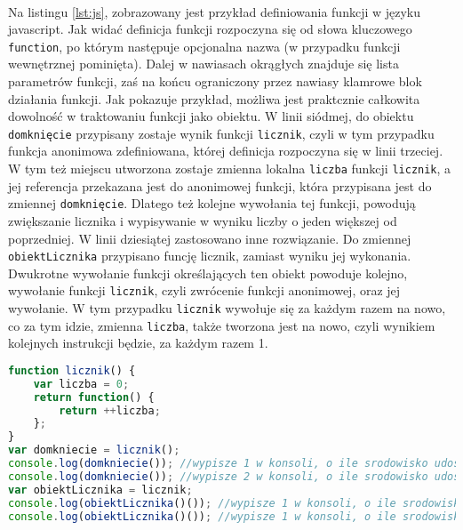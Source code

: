 \documentclass[a4paper,10pt]{report}
\begin{document}
\paragraph{}
Na listingu \ref{lst:js}, zobrazowany jest przykład definiowania funkcji w języku javascript. Jak widać definicja funkcji rozpoczyna się od słowa kluczowego \verb|function|, po którym następuje opcjonalna nazwa (w przypadku funkcji wewnętrznej pominięta). Dalej w nawiasach okrągłych znajduje się lista parametrów funkcji, zaś na końcu ograniczony przez nawiasy klamrowe blok działania funkcji. Jak pokazuje przykład, możliwa jest praktcznie całkowita dowolność w traktowaniu funkcji jako obiektu. W linii siódmej, do obiektu \verb|domknięcie| przypisany zostaje wynik funkcji \verb|licznik|, czyli w tym przypadku funkcja anonimowa zdefiniowana, której definicja rozpoczyna się w linii trzeciej. W tym też miejscu utworzona zostaje zmienna lokalna \verb|liczba| funkcji \verb|licznik|, a jej referencja przekazana jest do anonimowej funkcji, która przypisana jest do zmiennej \verb|domknięcie|. Dlatego też kolejne wywołania tej funkcji, powodują zwiększanie licznika i wypisywanie w wyniku liczby o jeden większej od poprzedniej. W linii dziesiątej zastosowano inne rozwiązanie. Do zmiennej \verb|obiektLicznika| przypisano funcję licznik, zamiast wyniku jej wykonania. Dwukrotne wywołanie funkcji określających ten obiekt powoduje kolejno, wywołanie funkcji \verb|licznik|, czyli zwrócenie funkcji anonimowej, oraz jej wywołanie. W tym przypadku \verb|licznik| wywołuje się za każdym razem na nowo, co za tym idzie, zmienna \verb|liczba|, także tworzona jest na nowo, czyli wynikiem kolejnych instrukcji będzie, za każdym razem 1.
\begin{lstlisting}[caption={Funkcyjność w języku javascript},label={lst:js},language=Javascript]
function licznik() {
	var liczba = 0;
	return function() {
		return ++liczba;
	};
}
var domkniecie = licznik();
console.log(domkniecie()); //wypisze 1 w konsoli, o ile srodowisko udostepnia obiekt console
console.log(domkniecie()); //wypisze 2 w konsoli, o ile srodowisko udostepnia obiekt console
var obiektLicznika = licznik;
console.log(obiektLicznika()()); //wypisze 1 w konsoli, o ile srodowisko udostepnia obiekt console
console.log(obiektLicznika()()); //wypisze 1 w konsoli, o ile srodowisko udostepnia obiekt console
\end{lstlisting}
\end{document}
